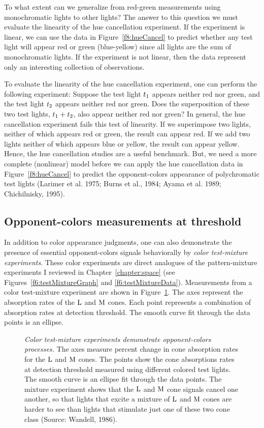To what extent can we generalize from red-green measurements using
monochromatic lights to other lights?  The answer to this question we
must evaluate the linearity of the hue cancellation experiment.  If the
experiment is linear, we can use the data in Figure~\ref{f8:hueCancel}
to predict whether any test light will appear red or green
(blue-yellow) since all lights are the sum of monochromatic lights.  If the
experiment is not linear, then the data represent only an interesting
collection of observations.

To evaluate the linearity of the hue cancellation experiment, one can
perform the following experiment: Suppose the test light $\mbox{$t_{1}$}$
appears neither red nor green, and the test light $\mbox{$t_{2}$}$ appears
neither red nor green.  Does the superposition of these two test
lights, $\mbox{$t_{1}$} + \mbox{$t_{2}$}$, also appear neither red nor green?
In general, the hue cancellation experiment fails this test of
linearity.  If we superimpose two lights, neither of which appears red
or green, the result can appear red.  If we add two lights neither of
which appears blue or yellow, the result can appear yellow.  Hence,
the hue cancellation studies are a useful benchmark.  But, we need a
more complete (nonlinear) model before we can apply the hue
cancellation data in Figure~\ref{f8:hueCancel} to predict the
opponent-colors appearance of polychromatic test lights (Larimer et
al. 1975; Burns et al., 1984; Ayama et al. 1989; Chichilnisky, 1995).

\subsection*{Opponent-colors measurements at threshold} 

In addition to color appearance judgments, one can also demonstrate
the presence of essential opponent-colors signals behaviorally by
{\em color test-mixture experiments}.  These color experiments are
direct analogues of the pattern-mixture experiments I reviewed in
Chapter~\ref{chapter:space} (see Figures~\ref{f6:testMixtureGraph}
and \ref{f6:testMixtureData}).  Measurements from a color
test-mixture experiment are shown in Figure~\ref{f8:opponentB}.  The
axes represent the absorption rates of the $\mbox{L}$ and $\mbox{M}$ cones.
Each point represents a combination of absorption rates at detection
threshold.  The smooth curve fit through the data points is an
ellipse.  \begin{figure} \centerline{
}
\caption[Color ellipse]{
{\em Color test-mixture experiments demonstrate opponent-colors
processes.}  The axes measure percent change in cone absorption
rates for the $\mbox{L}$ and $\mbox{M}$ cones.  The points show the cone
absorptions rates at detection threshold measured using different
colored test lights.  The smooth curve is an ellipse fit through the
data points.  The mixture experiment shows that the $\mbox{L}$ and
$\mbox{M}$ cone signals cancel one another, so that lights that excite a
mixture of $\mbox{L}$ and $\mbox{M}$ cones are harder to see than lights that
stimulate just one of these two cone class (Source: Wandell, 1986).  }
\label{f8:opponentB}
\end{figure}

